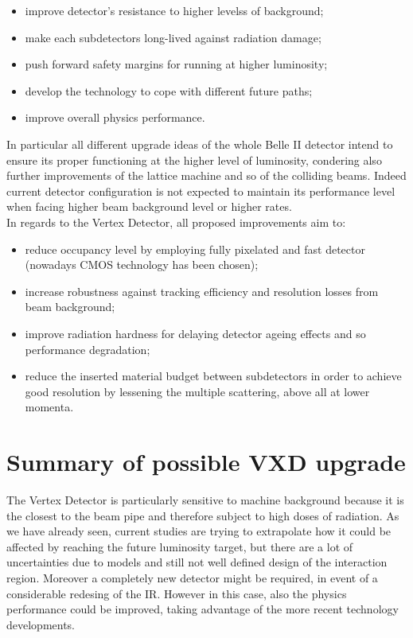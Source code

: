 \begin{itemize}
\item improve detector's resistance to higher levelss of background;
\item make each subdetectors long-lived against radiation damage;
\item push forward safety margins for running at higher luminosity;
\item develop the technology to cope with different future paths;
\item improve overall physics performance.
\end{itemize}


In particular all different upgrade ideas of the whole Belle II detector intend to ensure its proper functioning at the higher level of luminosity, condering also further improvements of the lattice machine and so of the colliding beams. Indeed current detector configuration is not expected to maintain its performance level when facing higher beam background level or higher rates.\\

In regards to the Vertex Detector, all proposed improvements aim to:

\begin{itemize}
\item reduce occupancy level by employing fully pixelated and fast detector (nowadays CMOS technology has been chosen);
\item increase robustness against tracking efficiency and resolution losses from beam background;
\item improve radiation hardness for delaying detector ageing effects and so performance degradation;
\item reduce the inserted material budget between subdetectors in order to achieve good resolution by lessening the multiple scattering, above all at lower momenta.
\end{itemize}


\section{Summary of possible VXD upgrade}

The Vertex Detector is particularly sensitive to machine background because it is the closest to the beam pipe and therefore subject to high doses of radiation.
As we have already seen, current studies are trying to extrapolate how it could be affected by reaching the future luminosity target, but there are a lot of uncertainties due to models and still not well defined design of the interaction region. Moreover a completely new detector might be required, in event of a considerable redesing of the IR. However in this case, also the physics performance could be improved, taking advantage of the more recent technology developments.\\

